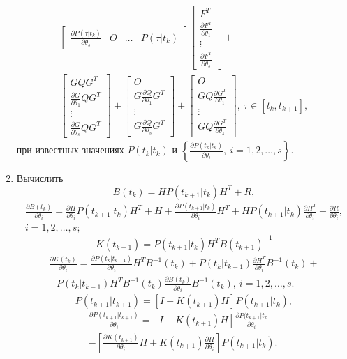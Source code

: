 \documentclass[a4paper,14pt]{extarticle}
\newcommand{\pd}[2]{\frac{\partial #1}{\partial #2}}
\newcommand{\inv}[1]{#1^{-1}}
\begin{document}
\begin{enumerate}
\begin{gather*}
\begin{bmatrix}
		\pd{P(\tau|t_k)}{\theta_s} & O & \ldots & P(\tau|t_k)
	\end{bmatrix}
	\begin{bmatrix}
		F^T \\
		\pd{F^T}{\theta_1} \\
		\vdots \\
		\pd{F^T}{\theta_s}
	\end{bmatrix} + \\
	\begin{bmatrix}
		G Q G^T \\
		\pd{G}{\theta_1} Q G^T \\
		\vdots \\
		\pd{G}{\theta_s} Q G^T 
	\end{bmatrix} +
	\begin{bmatrix}
		O \\
		G \pd{Q}{\theta_1} G^T \\
		\vdots \\
		G \pd{Q}{\theta_s} G^T
	\end{bmatrix} +
	\begin{bmatrix}
		O \\
		G Q \pd{G^T}{\theta_1} \\
		\vdots \\
		G Q \pd{G^T}{\theta_s}
	\end{bmatrix},\ \tau \in [t_k, t_{k+1}],
\end{gather*}
при известных значениях $P(t_k|t_k)$ и
	$\left\{ \pd{P(t_k| t_k)}{\theta_i},\ i = 1,2,\ldots,s \right\}$.

\item Вычислить
	\[
		B(t_k) = H P(t_{k+1}|t_k) H^T + R,
	\]
	\begin{align*}
		\pd{B(t_k)}{\theta_i} = \pd{H}{\theta_i} P(t_{k+1}|t_k) H^T + 
			H + \pd{P(t_{k+1}|t_k)}{\theta_i} H^T + H P(t_{k+1}|t_k)
			\pd{H^T}{\theta_i} + \pd{R}{\theta_i}, \\
		i = 1,2,\ldots,s;
	\end{align*}
	\[
		K(t_{k+1}) = P(t_{k+1}|t_k) H^T \inv{B(t_{k+1})}
	\]
	\begin{multline*}
		\pd{K(t_k)}{\theta_i} = \pd{P(t_k|t_{k-1})}{\theta_i} H^T \inv{B}(t_k) +
			P(t_k|t_{k-1}) \pd{H^T}{\theta_i} \inv{B}(t_k) + \\ - P(t_k|t_{k-1}) H^T
			\inv{B}(t_k) \pd{B(t_k)}{\theta_i} \inv{B}(t_k),\ i = 1, 2, \ldots, s.
	\end{multline*}
	\[
		P(t_{k+1}|t_{k+1}) = [ I - K(t_{k+1}) H ] P(t_{k+1}|t_k),
	\]
	\begin{multline*}
		\pd{P(t_{k+1}|t_{k+1})}{\theta_i} =
			[ I - K(t_{k+1}) H ] \pd{P(t_{k+1}|t_k}{\theta_i} + \\ -
			\left[
				\pd{K(t_{k+1})}{\theta_i} H + K(t_{k+1}) \pd{H}{\theta_i}
			\right]
			P(t_{k+1}|t_k).
	\end{multline*}


\end{enumerate}
\end{document}
